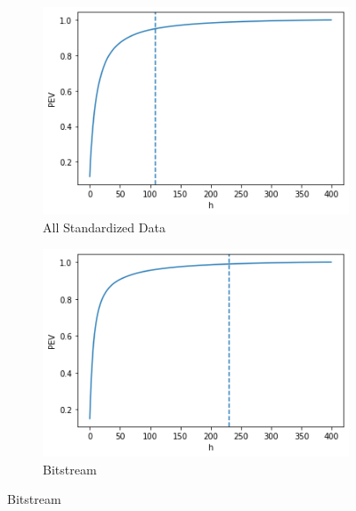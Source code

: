 \documentclass{homework}
\begin{document}
\begin{figure}[h]
\begin{subfigure}{0.4\textwidth}
\includegraphics[width=\linewidth]{h0pca.png}
\caption{All Standardized Data} \label{fig:a}
\end{subfigure}\hspace*{\fill}
\begin{subfigure}{0.4\textwidth}
\includegraphics[width=\linewidth]{hbit.png}
\caption{Bitstream} \label{fig:b}
\end{subfigure}


\end{figure}
\end{document}
